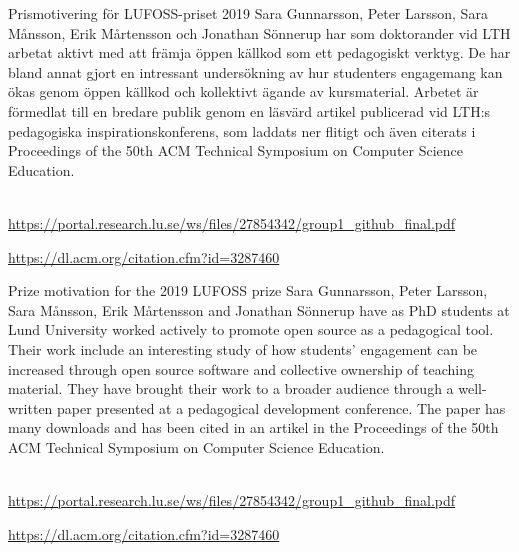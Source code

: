 \documentclass[aspectratio=169]{beamer}
\newenvironment{Slide}[1]%
  {\begin{frame}[environment=Slide]{#1}}
  {\end{frame}}%
\begin{document}
\begin{Slide}{Prismotivering för LUFOSS-priset 2019}
    Sara Gunnarsson, Peter Larsson, Sara Månsson, Erik Mårtensson och Jonathan Sönnerup har som doktorander vid LTH arbetat aktivt med att främja öppen källkod som ett pedagogiskt verktyg.
    De har bland annat gjort en intressant undersökning av hur studenters engagemang kan ökas genom öppen källkod och kollektivt ägande av kursmaterial. 
    Arbetet är förmedlat till en bredare publik genom en läsvärd artikel publicerad vid LTH:s pedagogiska inspirationskonferens, som laddats ner flitigt och även citerats i Proceedings of the 50th ACM Technical Symposium on Computer Science Education. 
 

  {~\\\footnotesize\url{https://portal.research.lu.se/ws/files/27854342/group1_github_final.pdf}}

  {\footnotesize\url{https://dl.acm.org/citation.cfm?id=3287460}}
 
  \end{Slide}

  \begin{Slide}{Prize motivation for the 2019 LUFOSS prize}
    Sara Gunnarsson, Peter Larsson, Sara Månsson, Erik Mårtensson and Jonathan Sönnerup have as PhD students at Lund University worked actively to promote open source as a pedagogical tool. Their work include an interesting study of how students' engagement can be increased through open source software and collective ownership of teaching material. They have brought their work to a broader audience through a well-written paper presented at a pedagogical development conference. The paper has many downloads and has been cited in an artikel in the Proceedings of the 50th ACM Technical Symposium on Computer Science Education. 
 

  {~\\\footnotesize\url{https://portal.research.lu.se/ws/files/27854342/group1_github_final.pdf}}

  {\footnotesize\url{https://dl.acm.org/citation.cfm?id=3287460}}
 
  \end{Slide}
\end{document}
